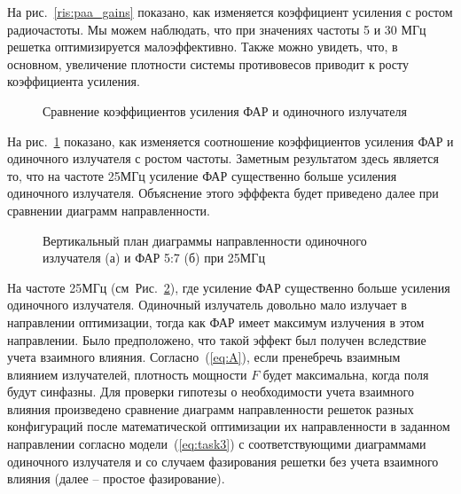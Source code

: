 На рис.~\ref{ris:paa_gains} показано, как изменяется коэффициент усиления с ростом радиочастоты. Мы можем наблюдать, что при значениях частоты 5 и 30 МГц решетка оптимизируется малоэффективно. Также можно увидеть, что, в основном, увеличение плотности системы противовесов приводит к росту коэффициента усиления.

\begin{figure}
\caption{Сравнение коэффициентов усиления ФАР и одиночного излучателя}
\label{ris:all_gains}
\end{figure}

На рис.~\ref{ris:all_gains} показано, как изменяется соотношение коэффициентов усиления ФАР и одиночного излучателя с ростом частоты. Заметным результатом здесь является то, что на частоте 25МГц усиление ФАР существенно больше усиления одиночного излучателя. Объяснение этого эфффекта будет приведено далее при сравнении диаграмм направленности.

\begin{figure}
\begin{minipage}[h]{0.49\linewidth}
\end{minipage}
\hfill
\begin{minipage}[h]{0.49\linewidth}
\end{minipage}
\caption{Вертикальный план диаграммы направленности одиночного излучателя (а) и ФАР 5:7 (б) при 25МГц}
\label{ris:f25mhs}
\end{figure}

На частоте 25МГц (см~Рис.~\ref{ris:f25mhs}), где усиление ФАР существенно больше усиления одиночного излучателя. Одиночный излучатель довольно мало излучает в направлении оптимизации, тогда как ФАР имеет максимум излучения в этом направлении. Было предположено, что такой эффект был получен вследствие учета взаимного влияния. Согласно~(\ref{eq:A}), если пренебречь взаимным влиянием излучателей, плотность мощности $F$ будет максимальна, когда поля будут синфазны. Для проверки гипотезы о необходимости учета взаимного влияния произведено сравнение диаграмм направленности решеток разных конфигураций после математической оптимизации их направленности в заданном направлении согласно модели~(\ref{eq:task3}) с соответствующими диаграммами одиночного излучателя и со случаем фазирования решетки без учета взаимного влияния (далее – простое фазирование).


